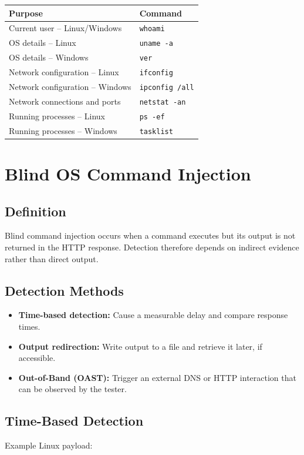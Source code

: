 \documentclass[12pt,a4paper]{article}
\newcommand{\nsection}[1]{\section{#1}}
\newcommand{\nsubsection}[1]{\subsection{#1}}
\begin{document}
\begin{longtable}{>{\raggedright\arraybackslash}p{}
        >{\raggedright\arraybackslash}p{}}
    \toprule
    \textbf{Purpose}                 & \textbf{Command}       \\
    \midrule
    Current user -- Linux/Windows    & \texttt{whoami}        \\
    OS details -- Linux              & \texttt{uname -a}      \\
    OS details -- Windows            & \texttt{ver}           \\
    Network configuration -- Linux   & \texttt{ifconfig}      \\
    Network configuration -- Windows & \texttt{ipconfig /all} \\
    Network connections and ports    & \texttt{netstat -an}   \\
    Running processes -- Linux       & \texttt{ps -ef}        \\
    Running processes -- Windows     & \texttt{tasklist}      \\
    \bottomrule
\end{longtable}

\newpage
\nsection{Blind OS Command Injection}

\vspace{0.4cm}
\nsubsection{Definition}

Blind command injection occurs when a command executes but its
output is not returned in the HTTP response. Detection therefore
depends on indirect evidence rather than direct output.

\vspace{0.4cm}
\nsubsection{Detection Methods}

\begin{itemize}
    \item \textbf{Time-based detection:}
          Cause a measurable delay and compare response times.
    \item \textbf{Output redirection:}
          Write output to a file and retrieve it later, if accessible.
    \item \textbf{Out-of-Band (OAST):}
          Trigger an external DNS or HTTP interaction that can be
          observed by the tester.
\end{itemize}

\vspace{0.4cm}
\nsubsection{Time-Based Detection}

Example Linux payload:
\end{document}
